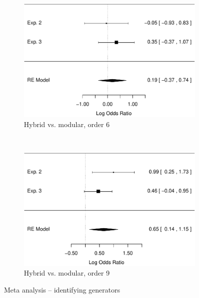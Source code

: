 \documentclass[man,mask,10pt]{apa6}
\begin{document}
\begin{figure}
\begin{subfigure}[c]{0.4\textwidth}
\includegraphics[width=\textwidth]{figures/meta/question_typegenerator_true_6_conditionhybrid.pdf}
\caption{Hybrid vs. modular, order 6}
\end{subfigure}
~
\begin{subfigure}[c]{0.4\textwidth}
\centering
\includegraphics[width=\textwidth]{figures/meta/question_typegenerator_true_9_conditionhybrid.pdf}
\caption{Hybrid vs. modular, order 9}
\end{subfigure}
\caption{Meta analysis -- identifying generators}
\label{meta_genT}
\end{figure}\noindent 
\end{document}

